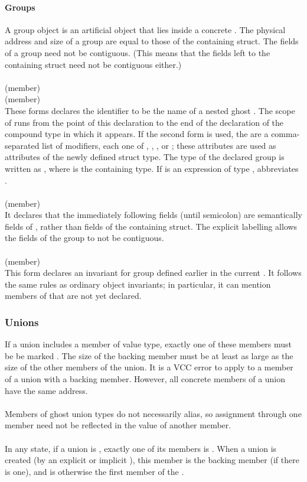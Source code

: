 \documentclass[preprint,nocopyrightspace]{sigplanconf}
\newcommand{\subsubsubsection}[1]{\paragraph{#1}}
\begin{document}
{{{\subsubsubsection{Groups}
A group object is an artificial object that lies inside a
concrete . The physical address and size of a group
are equal to those of the containing struct. The fields of a group
need not be contiguous. (This means that the fields left to the
containing struct need not be contiguous either.)
\\\\
\noindent{} (member)\\
 (member)\\
These forms declares the identifier  to be the name of a nested
ghost . The scope of  runs from the point of this
declaration to the end of the declaration of the compound type in
which it appears.
If the second form is used,
the  are a comma-separated list of modifiers,
each one of , , ,
or ; these attributes are used as attributes of the
newly defined struct type.
The type of the declared group is written as , where 
is the containing  type. If  is an expression of
type ,  abbreviates .
\\\\
 (member)\\
It declares that the immediately
following fields (until semicolon) are semantically fields of , rather than fields of
the containing struct. The explicit labelling allows the fields of the
group to not be contiguous.
\\\\
 (member)\\
This form declares an invariant for group  defined earlier in
the current . It follows the same rules as ordinary object
invariants; in particular, it can mention members of  that are
not yet declared.

\subsubsection{Unions}
If a union includes a member of value type, exactly one of
these members must be be marked . The size of
the backing member must be at least as large as the size of the other
members of the union. It is a VCC error to apply \vcc{&} to a 
member of a union with a backing member. However, all concrete members of a
union have the same address.
\\\\
Members of ghost union types do not necessarily alias, so assignment
through one member need not be reflected in the value of another
member.  
\\\\
In any state, if a union is \vcc{\valid}, exactly one of its members
is \vcc{\valid}. When a union is created (by an explicit or
implicit \vcc{\unblobify}), this member is the backing member (if
there is one), and is otherwise the first member of the .

}}}
\end{document}
